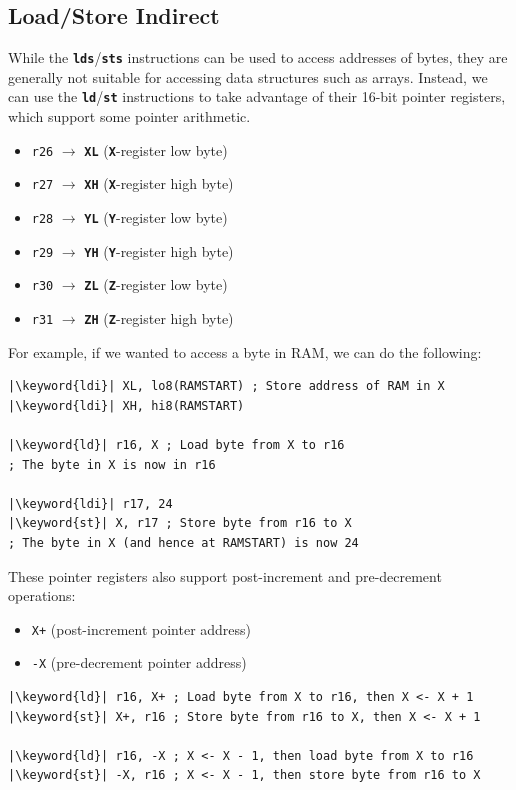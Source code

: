 \documentclass[a4paper]{report}
\newcommand{\keyword}[1]{\textcolor[rgb]{0.00,0.50,0.00}{\textbf{#1}}}
\newcommand{\keywordinline}[1]{\textcolor[rgb]{0.00,0.50,0.00}{\textbf{\texttt{#1}}}}
\begin{document}
\subsection{Load/Store Indirect}
While the \keywordinline{lds}/\keywordinline{sts} instructions can be used to access addresses
of bytes, they are generally not suitable for accessing data structures such as arrays.
Instead, we can use the \keywordinline{ld}/\keywordinline{st} instructions to
take advantage of their 16-bit pointer registers, which support some pointer arithmetic.
\begin{itemize}
    \item \texttt{r26} \(\to\) \keywordinline{XL} (\keywordinline{X}-register low byte)
    \item \texttt{r27} \(\to\) \keywordinline{XH} (\keywordinline{X}-register high byte)
    \item \texttt{r28} \(\to\) \keywordinline{YL} (\keywordinline{Y}-register low byte)
    \item \texttt{r29} \(\to\) \keywordinline{YH} (\keywordinline{Y}-register high byte)
    \item \texttt{r30} \(\to\) \keywordinline{ZL} (\keywordinline{Z}-register low byte)
    \item \texttt{r31} \(\to\) \keywordinline{ZH} (\keywordinline{Z}-register high byte)
\end{itemize}
For example, if we wanted to access a byte in RAM, we can do the following:
\begin{verbatim}
|\keyword{ldi}| XL, lo8(RAMSTART) ; Store address of RAM in X
|\keyword{ldi}| XH, hi8(RAMSTART)

|\keyword{ld}| r16, X ; Load byte from X to r16
; The byte in X is now in r16

|\keyword{ldi}| r17, 24
|\keyword{st}| X, r17 ; Store byte from r16 to X
; The byte in X (and hence at RAMSTART) is now 24
\end{verbatim}
These pointer registers also support post-increment and pre-decrement operations:
\begin{itemize}
    \item \texttt{X+} (post-increment pointer address)
    \item \texttt{-X} (pre-decrement pointer address)
\end{itemize}
\begin{verbatim}
|\keyword{ld}| r16, X+ ; Load byte from X to r16, then X <- X + 1
|\keyword{st}| X+, r16 ; Store byte from r16 to X, then X <- X + 1

|\keyword{ld}| r16, -X ; X <- X - 1, then load byte from X to r16
|\keyword{st}| -X, r16 ; X <- X - 1, then store byte from r16 to X
\end{verbatim}
\end{document}
